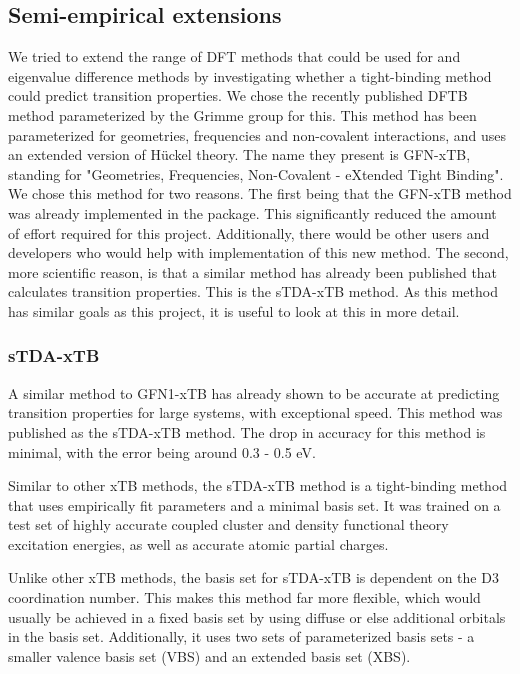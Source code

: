 \subsection{Semi-empirical extensions}
\label{subsec:dscf_xtb}
We tried to extend the range of DFT methods that could be used for \dscf and 
eigenvalue difference methods by investigating whether a tight-binding method
could predict transition properties.
We chose the recently published DFTB method parameterized by the Grimme group for
this. This method has been parameterized for geometries, frequencies and non-covalent
interactions, and uses an extended version of H{\"u}ckel theory. The name they
present is GFN-xTB, standing for "Geometries, Frequencies, Non-Covalent - eXtended 
Tight Binding".
We chose this method for two reasons. The first being that the GFN-xTB method was
already implemented in the  package. This significantly reduced the
amount of effort required for this project. Additionally, there would be other
users and developers who would help with implementation of this new method.
The second, more scientific reason, is that a similar method has already been
published that calculates transition properties. This is the sTDA-xTB method. 
As this method has similar goals as this project, it is useful to look at this 
in more detail.

\subsubsection{sTDA-xTB}
\label{subsubsec:stda_xtb}
A similar method to GFN1-xTB has already shown to be accurate at predicting
transition properties for large systems, with exceptional speed. This method was
published as the sTDA-xTB method\cite{Grimme2016}. The drop in accuracy for this
method is minimal, with the error being around 0.3 - 0.5 eV.

Similar to other xTB methods, the sTDA-xTB method is a tight-binding method that
uses empirically fit parameters and a minimal basis set. It was trained on a
test set of highly accurate coupled cluster and density functional theory
excitation energies, as well as accurate atomic partial charges.

Unlike other xTB methods, the basis set for sTDA-xTB is dependent on the D3
coordination number. This makes this method far more flexible, which would usually
be achieved in a fixed basis set by using diffuse or else additional orbitals in
the basis set. Additionally, it uses two sets of parameterized basis sets - a
smaller valence basis set (VBS) and an extended basis set (XBS).

